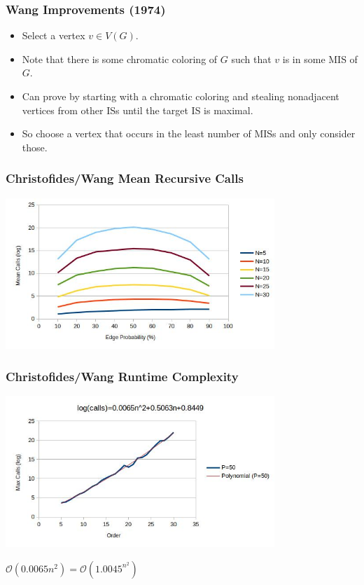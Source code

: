 \documentclass{beamer}
\newcommand{\BO}{\mathcal{O}}
\begin{document}
\begin{frame}
  \frametitle{Wang Improvements (1974)}
  \begin{itemize}
  \item Select a vertex \(v\in V(G)\).
  \item Note that there is some chromatic coloring of \(G\) such that \(v\) is in some MIS of \(G\).
  \item Can prove by starting with a chromatic coloring and stealing nonadjacent vertices from other ISs until
    the target IS is maximal.
  \item So choose a vertex that occurs in the least number of MISs and only consider those.
  \end{itemize}
\end{frame}

\begin{frame}
  \frametitle{Christofides/Wang Mean Recursive Calls}
  \begin{center}
    \includegraphics[width=4in]{../final/wang_calls}
  \end{center}
\end{frame}

\begin{frame}
  \frametitle{Christofides/Wang Runtime Complexity}
  \begin{center}
    \includegraphics[width=4in]{../final/wang_runtime}

    \bigskip

    \(\BO(0.0065n^2)=\BO(1.0045^{n^2})\)
  \end{center}
\end{frame}
\end{document}
